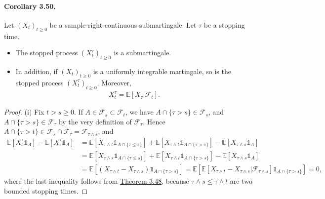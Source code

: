 \documentclass{article}
\numberwithin{equation}{section}
\newcommand{\E}{\mathbb{E}}
\theoremstyle{plain}
\theoremstyle{definition}
\begin{document}
\paragraph{Corollary 3.50.\label{cor:3.50}} Let $(X_t)_{t\geq 0}$ be a sample-right-continuous submartingale. Let $\tau$ be a stopping time.
\begin{itemize}
	\item[(i)] The stopped process $(X_t^\tau)_{t\geq 0}$ is a submartingale.
	\item[(ii)] In addition, if $(X_t)_{t\geq 0}$ is a uniformly integrable martingale, so is the stopped process $(X_t^\tau)_{t\geq 0}$. Moreover,
	\begin{align*}
		X_t^\tau = \E[X_\tau|\mathscr{F}_t].
	\end{align*}
\end{itemize}
\begin{proof}
(i) Fix $t>s\geq 0$. If $A\in\mathscr{F}_s\subset\mathscr{F}_t$, we have $A\cap\{\tau>s\}\in\mathscr{F}_s$, and $A\cap\{\tau>s\}\in\mathscr{F}_\tau$ by the very definition of $\mathscr{F}_\tau$. Hence $A\cap\{\tau>t\}\in\mathscr{F}_s\cap\mathscr{F}_\tau=\mathscr{F}_{\tau\wedge s}$, and
\begin{align*}
	\E\left[X_t^\tau\mathds{1}_A\right] - \E\left[X_s^\tau\mathds{1}_A\right]  &= \E\left[X_{\tau\wedge t}\mathds{1}_{A\cap\{\tau\leq s\}}\right] + \E\left[X_{\tau\wedge t}\mathds{1}_{A\cap\{\tau>s\}}\right] - \E\left[X_{\tau\wedge s}\mathds{1}_A\right]\\
	&= \E\left[X_{\tau\wedge s}\mathds{1}_{A\cap\{\tau\leq s\}}\right] + \E\left[X_{\tau\wedge t}\mathds{1}_{A\cap\{\tau>s\}}\right] - \E\left[X_{\tau\wedge s}\mathds{1}_A\right]\\
	&=\E\left[(X_{\tau\wedge t}-X_{\tau\wedge s})\mathds{1}_{A\cap\{\tau>s\}}\right]=\E\left[\E\left[X_{\tau\wedge t}-X_{\tau\wedge s}|\mathscr{F}_{\tau\wedge s}\right]\mathds{1}_{A\cap\{\tau>s\}}\right] = 0,
\end{align*}
where the last inequality follows from \hyperref[thm:3.48]{Theorem 3.48}, because $\tau\wedge s\leq\tau\wedge t$ are two bounded stopping times.\vspace{0.1cm}


\end{proof}
\end{document}
